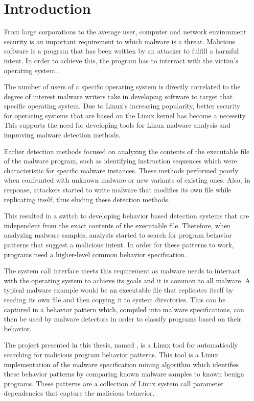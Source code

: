 \chapter{Introduction}
\label{chapter:intro}

From large corporations to the average user, computer and network environment security is an important requirement to which malware is a threat. Malicious software is a program that has been written by an attacker to fulfill a harmful intent. In order to achieve this, the program has to interract with the victim's operating system..

The number of users of a specific operating system is directly correlated to the degree of interest malware writers take in developing software to target that specific operating system. Due to Linux's increasing popularity, better security for operating systems that are based on the Linux kernel has become a necessity. This supports the need for developing tools for Linux malware analysis and improving malware detection methods.

Earlier detection methods focused on analyzing the contents of the executable file of the malware program, such as identifying instruction sequences which were characteristic for specific malware instances. These methods performed poorly when confrunted with unknown malware or new variants of existing ones. Also, in response, attackers started to write malware that modifies its own file while replicating itself, thus eluding these detection methods.

This resulted in a switch to developing behavior based detection systems that are independent from the exact contents of the executable file. Therefore, when analyzing malware samples, analysts started to search for program behavior patterns that suggest a malicious intent. In order for these patterns to work, programs need a higher-level common behavior specification.

The system call interface meets this requirement as malware needs to interract with the operating system to achieve its goals and it is common to all malware. A typical malware example would be an executable file that replicates itself by reading its own file and then copying it to system directories. This can be captured in a behavior pattern which, compiled into malware specifications, can then be used by malware detectors in order to classify programs based on their behavior.

The project presented in this thesis, named \textbf{\project}, is a Linux tool for automatically searching for malicious program behavior patterns. This tool is a Linux implementation of the malware specification mining algorithm which identifies these behavior patterns by comparing known malware samples to known benign programs. These patterns are a collection of Linux system call parameter dependencies that capture the malicious behavior.

